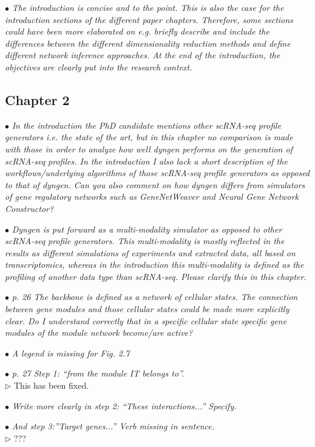 \documentclass[10pt]{article}
\newcommand{\exam}[2][\  ]{\hspace{0pt}\marginpar{\color{red}#1}$\bullet$ \textit{#2}}
\newcommand{\imp}[1]{{\color{red} #1}}
\newcommand{\nimp}[1]{{\color{gray} #1}}
\newcommand{\answ}[1]{{\color{blue} $\triangleright$ #1}}
\newcommand{\bigexclaim}{\raisebox{-0.1em}{\BigTriangleUp}\hspace{-0.32em}\llap{\small\textbf{!}}\hspace{0.32em}}
\newcommand{\tagimp}{\bigexclaim}
\newcommand{\tagtime}{{\Large $\hourglass$}}
\begin{document}
{\exam{\nimp{The introduction is concise and to the point. This is also the case for the introduction sections of the
		different paper chapters. Therefore,} some sections could have been more elaborated on e.g. briefly
		describe and include the differences between the different dimensionality reduction methods and
		define different network inference approaches. \nimp{At the end of the introduction, the objectives are
		clearly put into the research context.}}

	

\subsection{Chapter 2}

\exam[\tagimp \tagtime]{In the introduction the PhD candidate mentions \imp{other scRNA-seq profile generators i.e. the
state of the art, but in this chapter no comparison is made with those in order to analyze how
well dyngen performs on the generation of scRNA-seq profiles.} In the introduction I also lack
a short description of the workflows/underlying algorithms of those scRNA-seq profile
generators as opposed to that of dyngen. Can you also comment on how dyngen differs from
simulators of gene regulatory networks such as GeneNetWeaver and Neural Gene Network
Constructor?}

\exam[\tagimp]{Dyngen is put forward as a multi-modality simulator as opposed to other scRNA-seq profile
generators. \imp{This multi-modality is mostly reflected in the results as different simulations of
experiments and extracted data, all based on transcriptomics, whereas in the introduction
this multi-modality is defined as the profiling of another data type than scRNA-seq.} Please
clarify this in this chapter.}


\exam{p. 26 The backbone is defined as a network of cellular states. The connection between gene
modules and those cellular states could be made more explicitly clear. Do I understand
correctly that in a specific cellular state specific gene modules of the module network
become/are active?}

\exam{A legend is missing for Fig. 2.7}

\exam{p. 27 Step 1: “from the module IT belongs to”.} \\
\answ{This has been fixed.}

\exam{Write more clearly in step 2: “These
interactions...” Specify.}

\exam{And step 3:”Target genes...” Verb missing in sentence.} \\
\answ{???}

}
\end{document}
